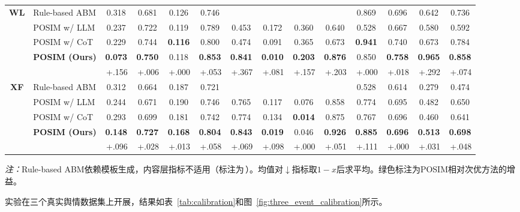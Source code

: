 \documentclass[lettersize,journal]{IEEEtran}
\newcommand{\best}[1]{\textbf{#1}}
\newcommand{\na}{\text{---}}
\newcommand{\gain}[1]{{\scriptsize\textcolor{gaingreen}{\,#1}}}
\begin{document}
\begin{table}[!t]
{\begin{tabular}{@{}cl cccc cccc cccc@{}}
\midrule
\multirow{5}{*}{\textbf{WL}}
& Rule-based ABM        & 0.318 & 0.681 & 0.126 & 0.746 & \na & \na & \na & \na & 0.869 & 0.696 & 0.642 & 0.736 \\
& POSIM w/ LLM        & 0.237 & 0.722 & 0.119 & 0.789 & 0.453 & 0.172 & 0.360 & 0.640 & 0.528 & 0.667 & 0.580 & 0.592 \\
& POSIM w/ CoT          & 0.229 & 0.744 & \best{0.116} & 0.800 & 0.474 & 0.091 & 0.365 & 0.673 & \best{0.941} & 0.740 & 0.673 & 0.784 \\
\rowcolor{oursrow}
& \textbf{POSIM (Ours)}  & \best{0.073} & \best{0.750} & 0.118 & \best{0.853} & \best{0.841} & \best{0.010} & \best{0.203} & \best{0.876} & 0.850 & \best{0.758} & \best{0.965} & \best{0.858} \\[1pt]
\rowcolor{oursrow}
& & \gain{+.156} & \gain{+.006} & \gain{+.000} & \gain{+.053} & \gain{+.367} & \gain{+.081} & \gain{+.157} & \gain{+.203} & \gain{+.000} & \gain{+.018} & \gain{+.292} & \gain{+.074} \\
\midrule
\multirow{5}{*}{\textbf{XF}}
& Rule-based ABM        & 0.312 & 0.664 & 0.187 & 0.721 & \na & \na & \na & \na & 0.528 & 0.614 & 0.279 & 0.474 \\
& POSIM w/ LLM        & 0.244 & 0.671 & 0.190 & 0.746 & 0.765 & 0.117 & 0.076 & 0.858 & 0.774 & 0.695 & 0.482 & 0.650 \\
& POSIM w/ CoT          & 0.293 & 0.699 & 0.181 & 0.742 & 0.774 & 0.134 & \best{0.014} & 0.875 & 0.767 & 0.696 & 0.460 & 0.641 \\
\rowcolor{oursrow}
& \textbf{POSIM (Ours)}  & \best{0.148} & \best{0.727} & \best{0.168} & \best{0.804} & \best{0.843} & \best{0.019} & 0.046 & \best{0.926} & \best{0.885} & \best{0.696} & \best{0.513} & \best{0.698} \\[1pt]
\rowcolor{oursrow}
& & \gain{+.096} & \gain{+.028} & \gain{+.013} & \gain{+.058} & \gain{+.069} & \gain{+.098} & \gain{+.000} & \gain{+.051} & \gain{+.111} & \gain{+.000} & \gain{+.031} & \gain{+.048} \\
\bottomrule
\end{tabular}%
}
\vspace{2pt}
{\scriptsize \textit{注：}Rule-based ABM依赖模板生成，内容层指标不适用（标注为\,\na）。均值对$\downarrow$指标取$1{-}x$后求平均。\textcolor{gaingreen}{绿色}标注为POSIM相对次优方法的增益。}
\end{table}

实验在三个真实舆情数据集上开展，结果如表~\ref{tab:calibration}和图~\ref{fig:three_event_calibration}所示。
\end{document}
